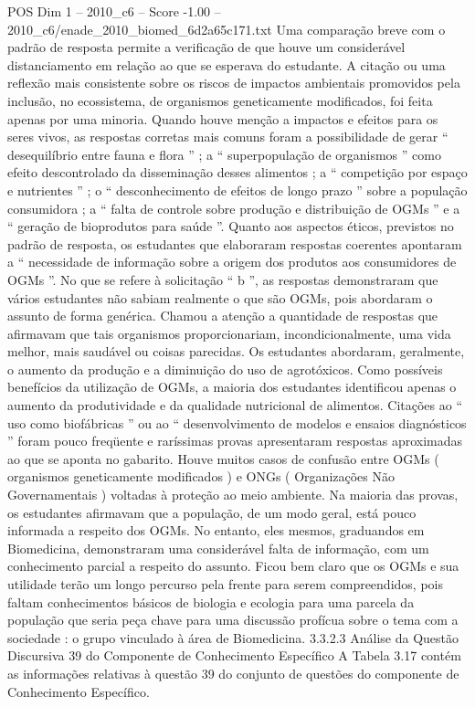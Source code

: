\begin{textsample}{POS Dim 1 – 2010\_c6 – Score -1.00 – 2010\_c6/enade\_2010\_biomed\_6d2a65c171.txt}
Uma comparação breve com o padrão de resposta permite a verificação de que houve um considerável distanciamento em relação ao que se esperava do estudante.
A citação ou uma reflexão mais consistente sobre os riscos de impactos ambientais promovidos pela inclusão, no ecossistema, de organismos geneticamente modificados, foi feita apenas por uma minoria.
Quando houve menção a impactos e efeitos para os seres vivos, as respostas corretas mais comuns foram a possibilidade de gerar “ desequilíbrio entre fauna e flora ” ; a “ superpopulação de organismos ” como efeito descontrolado da disseminação desses alimentos ; a “ competição por espaço e nutrientes ” ; o “ desconhecimento de efeitos de longo prazo ” sobre a população consumidora ; a “ falta de controle sobre produção e distribuição de OGMs ” e a “ geração de bioprodutos para saúde ”.
Quanto aos aspectos éticos, previstos no padrão de resposta, os estudantes que elaboraram respostas coerentes apontaram a “ necessidade de informação sobre a origem dos produtos aos consumidores de OGMs ”.
No que se refere à solicitação “ b ”, as respostas demonstraram que vários estudantes não sabiam realmente o que são OGMs, pois abordaram o assunto de forma genérica.
Chamou a atenção a quantidade de respostas que afirmavam que tais organismos proporcionariam, incondicionalmente, uma vida melhor, mais saudável ou coisas parecidas.
Os estudantes abordaram, geralmente, o aumento da produção e a diminuição do uso de agrotóxicos.
Como possíveis benefícios da utilização de OGMs, a maioria dos estudantes identificou apenas o aumento da produtividade e da qualidade nutricional de alimentos.
Citações ao “ uso como biofábricas ” ou ao “ desenvolvimento de modelos e ensaios diagnósticos ” foram pouco freqüente e raríssimas provas apresentaram respostas aproximadas ao que se aponta no gabarito.
Houve muitos casos de confusão entre OGMs ( organismos geneticamente modificados ) e ONGs ( Organizações Não Governamentais ) voltadas à proteção ao meio ambiente.
Na maioria das provas, os estudantes afirmavam que a população, de um modo geral, está pouco informada a respeito dos OGMs.
No entanto, eles mesmos, graduandos em Biomedicina, demonstraram uma considerável falta de informação, com um conhecimento parcial a respeito do assunto.
Ficou bem claro que os OGMs e sua utilidade terão um longo percurso pela frente para serem compreendidos, pois faltam conhecimentos básicos de biologia e ecologia para uma parcela da população que seria peça chave para uma discussão profícua sobre o tema com a sociedade : o grupo vinculado à área de Biomedicina. 3.3.2.3 Análise da Questão Discursiva 39 do Componente de Conhecimento Específico A Tabela 3.17 contém as informações relativas à questão 39 do conjunto de questões do componente de Conhecimento Específico.

\end{textsample}
